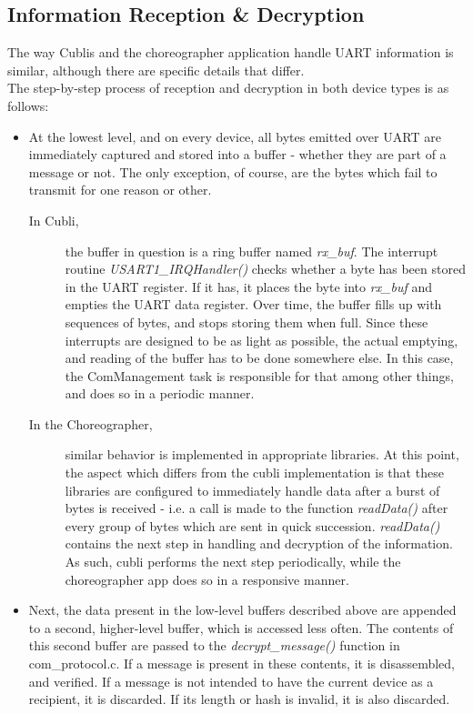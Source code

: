 \subsection{Information Reception \& Decryption}

The way Cublis and the choreographer application handle UART information is similar, although there are specific details that differ.\\

The step-by-step process of reception and decryption in both device types is as follows:\\

\begin{itemize}
\item At the lowest level, and on every device, all bytes emitted over UART are immediately captured and stored into a buffer - whether they are part of a message or not. The only exception, of course, are the bytes which fail to transmit for one reason or other.

\begin{description}
\item[In Cubli,] the buffer in question is a ring buffer named \textit{rx\_buf}. The interrupt routine \textit{USART1\_IRQHandler()} checks whether a byte has been stored in the UART register. If it has, it places the byte into \textit{rx\_buf} and empties the UART data register. Over time, the buffer fills up with sequences of bytes, and stops storing them when full. Since these interrupts are designed to be as light as possible, the actual emptying, and reading of the buffer has to be done somewhere else. In this case, the ComManagement task is responsible for that among other things, and does so in a periodic manner.
\item[In the Choreographer,] similar behavior is implemented in appropriate libraries. At this point, the aspect which differs from the cubli implementation is that these libraries are configured to immediately handle data after a burst of bytes is received - i.e. a call is made to the function \textit{readData()} after every group of bytes which are sent in quick succession. \textit{readData()} contains the next step in handling and decryption of the information.
As such, cubli performs the next step periodically, while the choreographer app does so in a responsive manner.
\end{description}

\item Next, the data present in the low-level buffers described above are appended to a second, higher-level buffer, which is accessed less often. The contents of this second buffer are passed to the \textit{decrypt\_message()} function in com\_protocol.c. If a message is present in these contents, it is disassembled, and verified. If a message is not intended to have the current device as a recipient, it is discarded. If its length or hash is invalid, it is also discarded.


\end{itemize}
